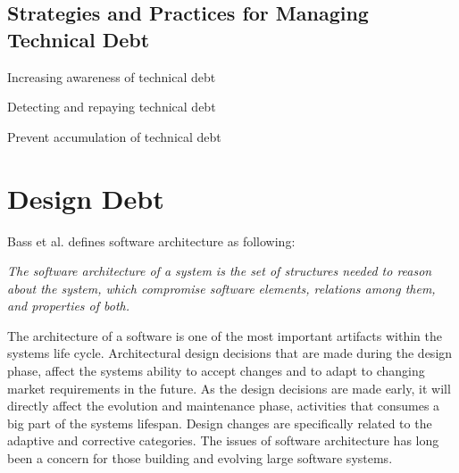 \subsection{Strategies and Practices for Managing Technical Debt}

Increasing awareness of technical debt

Detecting and repaying technical debt

Prevent accumulation of technical debt

























\section{Design Debt}
Bass et al.\cite{Bass:2012:SAP:2392670} defines software architecture as following: 

\begin{displayquote}
\textit{The software architecture of a system is the set of structures needed to reason about the system, which compromise software elements, relations among them, and properties of both.}
\end{displayquote}

The architecture of a software is one of the most important artifacts within the systems life cycle\cite{Bass:2012:SAP:2392670,knodel2006static}. Architectural design decisions that are made during the design phase, affect the systems ability to accept changes and to adapt to changing market requirements in the future. As the design decisions are made early, it will directly affect the evolution and maintenance phase\cite{Pressman:2009:SEP:1593949}, activities that consumes a big part of the systems lifespan\cite{Vliet:2008:SEP:1481475}. Design changes are specifically related to the adaptive and corrective categories. The issues of software architecture has long been a concern for those building and evolving large software systems\cite{perry1997state}.




